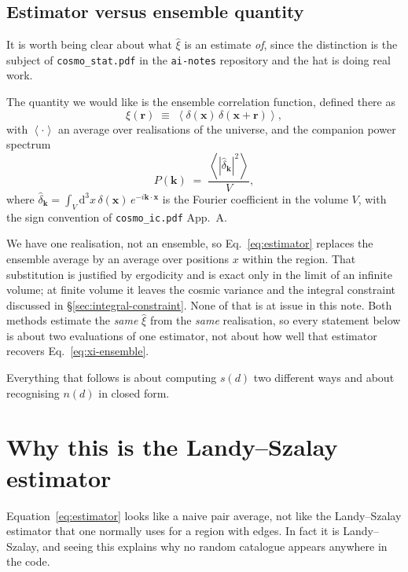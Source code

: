 \documentclass[12pt]{article}
\newcommand{\bk}{\mathbf{k}}
\newcommand{\bx}{\mathbf{x}}
\newcommand{\br}{\mathbf{r}}
\newcommand{\avg}[1]{\left\langle #1 \right\rangle}
\newcommand{\code}[1]{\texttt{#1}}
\begin{document}
\subsection{Estimator versus ensemble quantity}\label{sec:estimator-vs-ensemble}

It is worth being clear about what $\hat\xi$ is an estimate \emph{of}, since
the distinction is the subject of \code{cosmo\_stat.pdf} in the
\code{ai-notes} repository
and the hat is doing real work.

The quantity we would like is the ensemble correlation function, defined
there as
\begin{equation}\label{eq:xi-ensemble}
  \xi(\br) \;\equiv\; \avg{\delta(\bx)\,\delta(\bx+\br)} ,
\end{equation}
with $\avg{\cdot}$ an average over realisations of the universe, and the
companion power spectrum
\begin{equation}\label{eq:pk-ensemble}
  P(\bk) \;=\; \frac{\avg{|\hat\delta_\bk|^2}}{V} ,
\end{equation}
where $\hat\delta_\bk = \int_V \mathrm{d}^3x\, \delta(\bx)\,
e^{-i\bk\cdot\bx}$ is the Fourier coefficient in the volume $V$, with the
sign convention of \code{cosmo\_ic.pdf} App.~A.

We have one realisation, not an ensemble, so Eq.~\eqref{eq:estimator}
replaces the ensemble average by an average over positions $x$ within the
region.  That substitution is justified by ergodicity and is exact only in the
limit of an infinite volume; at finite volume it leaves the cosmic variance
and the integral constraint discussed in
\S\ref{sec:integral-constraint}.  None of that is at issue in this note.  Both
methods estimate the \emph{same} $\hat\xi$ from the \emph{same} realisation,
so every statement below is about two evaluations of one estimator, not about
how well that estimator recovers Eq.~\eqref{eq:xi-ensemble}.

Everything that follows is about computing $s(d)$ two different ways and
about recognising $n(d)$ in closed form.

\section{Why this is the Landy--Szalay estimator}\label{sec:ls}

Equation~\eqref{eq:estimator} looks like a naive pair average, not like the
Landy--Szalay estimator \citep{LandySzalay1993} that one normally uses for a
region with edges.  In fact it is Landy--Szalay, and seeing this explains why
no random catalogue appears anywhere in the code.
\end{document}
